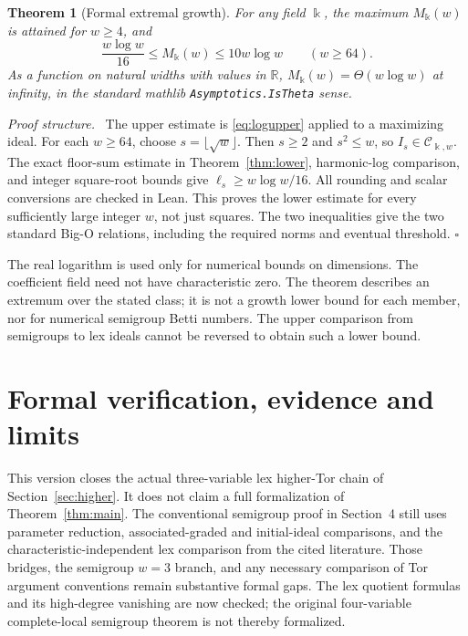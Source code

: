 \documentclass[11pt,a4paper]{article}
\newtheorem{theorem}{Theorem}[section]
\newenvironment{proof}[1][Proof]{\par\noindent\textit{#1.}\ \ignorespaces}{\unskip\nobreak\hfill\ensuremath{\square}\par}
\newcommand{\kk}{\Bbbk}
\begin{document}
\begin{theorem}[Formal extremal growth]\label{thm:theta}
For any field $\kk$, the maximum $M_{\kk}(w)$ is attained for $w\ge4$, and
\[
 \frac{w\log w}{16}\le M_{\kk}(w)\le10w\log w\qquad(w\ge64).
\]
As a function on natural widths with values in $\mathbb R$,
$M_{\kk}(w)=\Theta(w\log w)$ at infinity, in the standard mathlib
\texttt{Asymptotics.IsTheta} sense.
\end{theorem}
\begin{proof}[Proof structure]
The upper estimate is \eqref{eq:logupper} applied to a maximizing ideal.
For each $w\ge64$, choose $s=\lfloor\sqrt w\rfloor$. Then $s\ge2$ and
$s^2\le w$, so $I_s\in\mathcal C_{\kk,w}$. The exact floor-sum estimate in
Theorem~\ref{thm:lower}, harmonic-log comparison, and integer square-root
bounds give $\ell_s\ge w\log w/16$. All rounding and scalar conversions
are checked in Lean. This proves the lower estimate for every sufficiently
large integer $w$, not just squares. The two inequalities give the two standard
Big-O relations, including the required norms and eventual threshold.
\end{proof}
The real logarithm is used only for numerical bounds on dimensions. The
coefficient field need not have characteristic zero. The theorem describes
an extremum over the stated class; it is not a growth lower bound for each
member, nor for numerical semigroup Betti numbers. The upper comparison from
semigroups to lex ideals cannot be reversed to obtain such a lower bound.

\section{Formal verification, evidence and limits}\label{sec:formal}
This version closes the actual three-variable lex higher-Tor chain of
Section~\ref{sec:higher}. It does not claim a full formalization of
Theorem~\ref{thm:main}. The conventional semigroup proof in Section~4 still
uses parameter reduction, associated-graded and initial-ideal comparisons,
and the characteristic-independent lex comparison from the cited literature.
Those bridges, the semigroup $w=3$ branch, and any necessary comparison of
Tor argument conventions remain substantive formal gaps. The lex quotient
formulas and its high-degree vanishing are now checked; the original
four-variable complete-local semigroup theorem is not thereby formalized.
\end{document}
